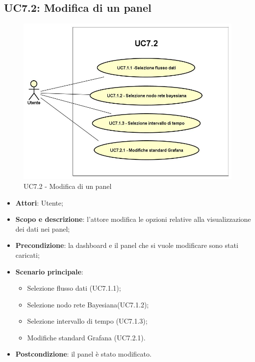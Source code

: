 \subsection{UC7.2: Modifica di un panel}
\hypertarget{UC7.2}{}
\begin{figure} [H]
	\centering
	\includegraphics[scale=0.45]{Img/UC7-2}
	\caption{UC7.2 - Modifica di un panel}\label{}
\end{figure}
\begin{itemize}
	\item \textbf{Attori}: Utente;
	\item \textbf{Scopo e descrizione}: l'attore modifica le opzioni relative alla visualizzazione dei dati nei panel;
	\item \textbf{Precondizione}: la dashboard e il panel che si vuole modificare sono stati caricati;
	\item \textbf{Scenario principale}:
	\begin{itemize}
		\item Selezione flusso dati  (UC7.1.1);
		\item Selezione nodo rete Bayesiana(UC7.1.2);
		\item Selezione intervallo di tempo (UC7.1.3);
		\item Modifiche standard Grafana  (UC7.2.1).		
	\end{itemize}
	\item \textbf{Postcondizione}: il panel è stato modificato.
\end{itemize}
